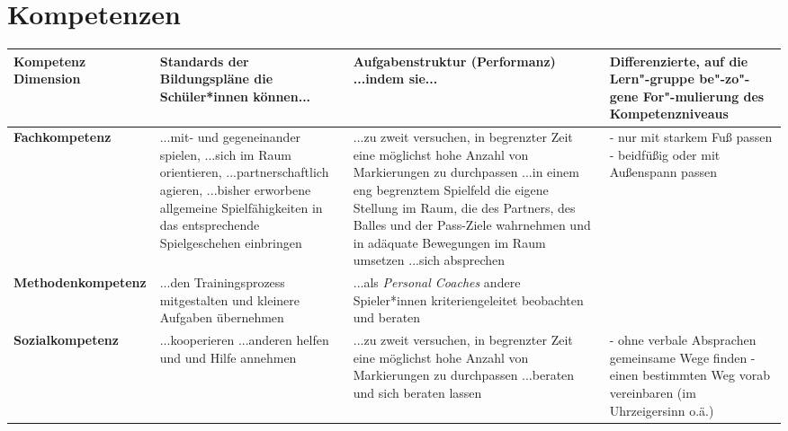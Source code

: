 \section{Kompetenzen}


\scriptsize
\singlespacing

\begin{longtable}{|p{3cm}|p{4cm}|p{4cm}|p{4cm}|}

\hline
\textbf{Kompetenz Dimension} &

\textbf{Standards der Bildungspläne \newline \newline die Schüler*innen können...} &

\textbf{Aufgabenstruktur (Performanz) \newline \newline ...indem sie...} &

\textbf{Differenzierte, auf die Lern"-gruppe be"-zo"-gene For"-mulierung des Kompetenzniveaus}

\\
\hline

\textbf{Fachkompetenz}
&
...mit- und gegeneinander spielen, \newline
...sich im Raum orientieren, \newline
...partnerschaftlich agieren, \newline
...bisher erworbene allgemeine Spielfähigkeiten in das entsprechende Spielgeschehen einbringen
&
...zu zweit versuchen, in begrenzter Zeit eine möglichst hohe Anzahl von Markierungen zu durchpassen \newline
...in einem eng begrenztem Spielfeld die eigene Stellung im Raum, die des Partners, des Balles und der Pass-Ziele wahrnehmen und in adäquate Bewegungen im Raum umsetzen \newline
...sich absprechen
&
- nur mit starkem Fuß passen\newline
- beidfüßig oder mit Außenspann passen \newline

\\
\hline

\textbf{Methodenkompetenz} &
...den Trainingsprozess mitgestalten und kleinere Aufgaben übernehmen
&
...als \emph{Personal Coaches} andere Spieler*innen kriteriengeleitet beobachten und beraten
&

\\
\hline

\textbf{Sozialkompetenz} &
 ...kooperieren \newline
 ...anderen helfen und und Hilfe annehmen
&
...zu zweit versuchen, in begrenzter Zeit eine möglichst hohe Anzahl von Markierungen zu durchpassen \newline
...beraten und sich beraten lassen
&
- ohne verbale Absprachen gemeinsame Wege finden \newline
- einen bestimmten Weg vorab vereinbaren (im Uhrzeigersinn o.ä.)
\\
\hline


\end{longtable}
